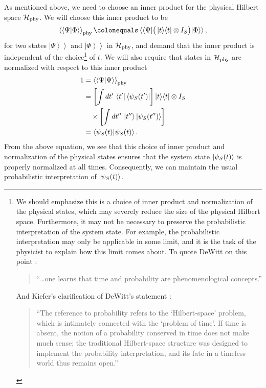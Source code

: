 \documentclass[a4paper,twocolumn,superscriptaddress,11pt,accepted=2019-06-04]{quantumarticle}
\newcommand{\ce}{\colonequals}
\newcommand{\kket}[1]{\left| \left. #1 \right> \right>} 		%
\newcommand{\nn}{\nonumber}		%
\begin{document}
{As mentioned above, we need to choose an inner product for the physical Hilbert space $\mathcal{H}_{\rm phy}$. We will choose this inner product to be
\begin{align}
\braket{\braket{\Psi|\Phi}}_{\rm phy} \ce \braket{\braket{\Psi| \big( \ket{t}\!\bra{t} \otimes I_S \big) |\Phi}}, \label{innerprod}
\end{align}
for two states $\kket{\Psi}$ and $\kket{\Phi}$ in $\mathcal{H}_{\rm phy}$, and demand that the inner product is independent of the choice\footnote{We should emphasize this is a choice of inner product and normalization of the physical states, which may severely reduce the size of the physical Hilbert space. Furthermore, it may not be necessary to preserve the probabilistic interpretation of the system state. For example, the probabilistic interpretation may only be applicable in some limit, and it is the task of the physicist to explain how this limit comes about. To quote DeWitt on this point \cite{DeWitt:1999, Kiefer:2012}:
\begin{quotation}
``\ldots one learns that time and probability are phenomenological concepts.''
\end{quotation}
And Kiefer's clarification of DeWitt's statement \cite{Kiefer:2012}:
\begin{quotation}
``The reference to probability refers to the `Hilbert-space' problem, which is intimately connected with the `problem of time'. If time is absent, the notion of a probability conserved in time does not make much sense; the traditional Hilbert-space structure was designed to implement the probability interpretation, and its fate in a timeless world thus remains open.''
\end{quotation}} of $t$. We will also require that states in $\mathcal{H}_{\rm phy}$ are normalized with respect to this inner product
\begin{align}
1 &= \braket{\braket{\Psi|\Psi}}_{\rm phy} \nn\\&=  \left[ \int dt' \, \bra{t'} \bra{\psi_S(t')} \right] \ket{t}\!\bra{t} \otimes I_S \nn \\
&\quad \times \left[ \int dt'' \, \ket{t''} \ket{\psi_S(t'')} \right] \nn\\
&= \braket{\psi_S(t) | \psi_S(t)}. \label{normalization}
\end{align}
From the above equation, we see that this choice of inner product and normalization of the physical states ensures that the system state $\ket{\psi_S(t)}$ is properly normalized at all {times}. Consequently, we can maintain the usual probabilistic interpretation of  $\ket{\psi_S(t)}$.

}
\end{document}
